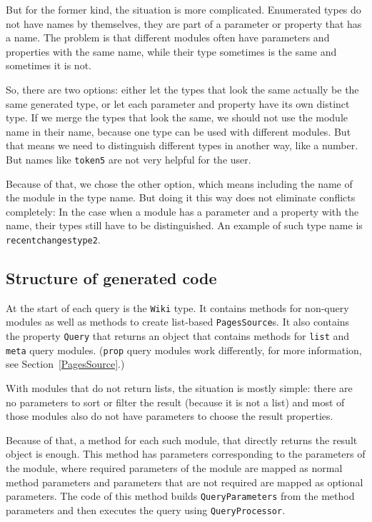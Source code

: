 But for the former kind, the situation is more complicated.
Enumerated types do not have names by themselves, they are part of a parameter or property that has a name.
The problem is that different modules often have parameters and properties with the same name,
while their type sometimes is the same and sometimes it is not.

So, there are two options: either let the types that look the same actually be the same generated type,
or let each parameter and property have its own distinct type.
If we merge the types that look the same, we should not use the module name in their name,
because one type can be used with different modules.
But that means we need to distinguish different types in another way, like a number.
But names like \lstinline{token5} are not very helpful for the user.

Because of that, we chose the other option, which means including the name of the module in the type name.
But doing it this way does not eliminate conflicts completely:
In the case when a module has a parameter and a property with the name,
their types still have to be distinguished.
An example of such type name is \lstinline{recentchangestype2}.

\subsection{Structure of generated code}
\label{ltwcg-structure}

At the start of each query is the \lstinline{Wiki} type.
It contains methods for non-query modules as well as methods to create list-based \lstinline{PagesSource}s.
It also contains the property \lstinline{Query} that returns an object that contains methods for
\texttt{list} and \texttt{meta} query modules.
(\texttt{prop} query modules work differently, for more information, see Section~\ref{PagesSource}.)

\medskip

With modules that do not return lists, the situation is mostly simple:
there are no parameters to sort or filter the result (because it is not a list)
and most of those modules also do not have parameters to choose the result properties.

Because of that, a method for each such module, that directly returns the result object is enough.
This method has parameters corresponding to the parameters of the module,
where required parameters of the module are mapped as normal method parameters
and parameters that are not required are mapped as optional parameters.
The code of this method builds \lstinline{QueryParameters} from the method parameters
and then executes the query using \lstinline{QueryProcessor}.


